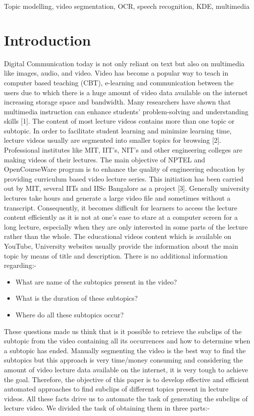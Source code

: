 \documentclass[conference]{IEEEtran}
\begin{document}
\begin{IEEEkeywords}
Topic modelling, video segmentation, OCR, speech recognition, KDE, multimedia
\end{IEEEkeywords}


\section{Introduction}

Digital Communication today is not only reliant on text but also on multimedia like images, audio, and video. Video has become a popular way to teach in computer based teaching (CBT), e-learning and communication between the users due to which there is a huge amount of video data available on the internet increasing storage space and bandwidth. Many researchers have shown that multimedia instruction can enhance students’ problem-solving and understanding skills [1]. The content of most lecture videos contains more than one topic or subtopic. In order to facilitate student learning and minimize learning time, lecture videos usually are segmented into smaller topics for browsing [2].\\ 
Professional institutes like MIT, IIT’s, NIT’s and other engineering colleges are making videos of their lectures. The main objective of NPTEL and OpenCourseWare program is to enhance the quality of engineering education by providing curriculum based video lecture series. This initiation has been carried out by MIT, several IITs and IISc Bangalore as a project [3]. Generally university lectures take hours and generate a large video file and sometimes without a transcript. Consequently, it becomes difficult for learners to access the lecture content efficiently as it is not at one’s ease to stare at a computer screen for a long lecture, especially when they are only interested in some parts of the lecture rather than the whole. The educational videos content which is available on YouTube, University websites usually provide the information about the main topic by means of title and description. There is no additional information regarding:-
\begin{itemize}
	\item What are name of the subtopics present in the video?
	\item What is the duration of these subtopics?
	\item Where do all these subtopics occur?
\end{itemize}

These questions made us think that is it possible to retrieve the subclips of the subtopic from the video containing all its occurrences and how to determine when a subtopic has ended. Manually segmenting the video is the best way to find the subtopics but this approach is very time/money consuming and considering the amount of video lecture data available on the internet, it is very tough to achieve the goal. Therefore, the objective of this paper is to develop effective and efficient automated approaches to find subclips of different topics present in lecture videos. All these facts drive us to automate the task of generating the subclips of lecture video. We divided the task of obtaining them in three
parts:-
\end{document}
